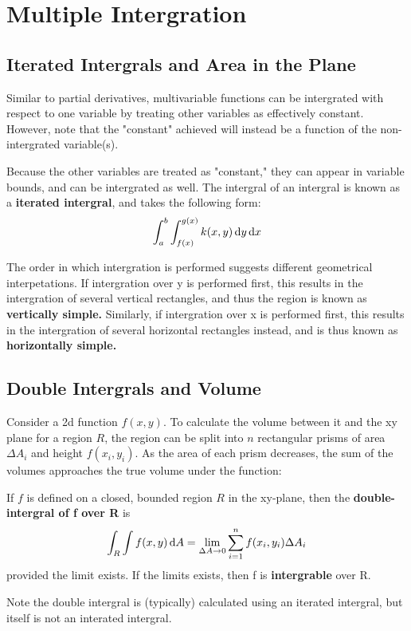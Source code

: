 \documentclass{article}
\begin{document}
\section{Multiple Intergration}
\subsection{Iterated Intergrals and Area in the Plane}
Similar to partial derivatives, multivariable functions can be intergrated with respect to one variable by treating other variables as effectively constant.
However, note that the "constant" achieved will instead be a function of the non-intergrated variable(s).

Because the other variables are treated as "constant," they can appear in variable bounds, and can be intergrated as well.
The intergral of an intergral is known as a \textbf{iterated intergral}, and takes the following form:
\[\int_{a}^{b} \int_{f(x)}^{g(x)} k(x,y) \odif{y}\odif{x}\]

The order in which intergration is performed suggests different geometrical interpetations.
If intergration over y is performed first, this results in the intergration of several vertical rectangles, and thus the region is known as \textbf{vertically simple.}
Similarly, if intergration over x is performed first, this results in the intergration of several horizontal rectangles instead, and is thus known as \textbf{horizontally simple.}

\subsection{Double Intergrals and Volume}
Consider a 2d function $f(x,y)$.
To calculate the volume between it and the xy plane for a region $R$, the region can be split into $n$ rectangular prisms of area $\Delta A_i$ and height $f(x_i, y_i)$.
As the area of each prism decreases, the sum of the volumes approaches the true volume under the function:
\begin{definition}
    If $f$ is defined on a closed, bounded region $R$ in the xy-plane, then the \textbf{double-intergral of f over R} is
    \[\int_{R} \int f(x,y) \odif{A} = \lim_{\Delta A \to 0} \sum_{i=1}^{n} f(x_i,y_i) \Delta A_i\]
    provided the limit exists. If the limits exists, then f is \textbf{intergrable} over R.
\end{definition}

Note the double intergral is (typically) calculated using an iterated intergral, but itself is not an interated intergral.
\end{document}
